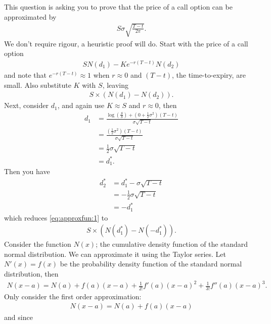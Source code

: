 \documentclass[11pt]{article}
\begin{document}
This question is asking you to prove that the price of a call option can be approximated by
\begin{align*}
  S \sigma \sqrt{\frac{T - t}{2\pi} }
\text{.}
\end{align*}
We don't require rigour, a heuristic proof will do.
Start with the price of a call option
\begin{align}
\label{eq:calloption:price}
S N(d_1)
- K e^{-r(T-t)} N(d_2)
\end{align}
and note that $e^{-r(T-t)} \approx 1$ when $r \approx 0$ and $(T-t)$, the time-to-expiry, are small.
Also substitute $K$ with $S$, leaving
\begin{align} \label{eq:approxfun:1}
S \times ( N(d_1) -  N(d_2) )
\text{.}
\end{align}
Next, consider $d_1$, and again use $K \approx S$ and $r \approx 0$, then
\begin{align*}
 d_1
 &=
 \frac{
      \log\left( \frac{S}{S} \right)
      + \left( 0 + \frac{1}{2}\sigma^2  \right)(T - t)
 }{
 \sigma \sqrt{T - t}
 } \\
 &=
 \frac{
      \left(\frac{1}{2}\sigma^2  \right)(T - t)
 }{
 \sigma \sqrt{T - t}
 } \\
 &=
 \frac{1}{2} \sigma \sqrt{T - t}
\\
 &= d_1^*
\text{.}
\end{align*}
Then you have
\begin{align*}
 d_2^* &= d_1^* - \sigma \sqrt{T - t} \\
       &=  -  \frac{1}{2} \sigma \sqrt{T - t} \\
       &=  - d_1^*
\end{align*}
which reduces
\eqref{eq:approxfun:1} to
\begin{align} \label{eq:approxfun:2}
S \times ( N(d_1^*) -  N(-d_1^*) )
\text{.}
\end{align}
Consider the function $N(x)$; the cumulative density function of the standard normal distribution.
We can approximate it using the Taylor series.
Let $N'(x) = f(x)$ be the probability density function of the standard normal distribution, then
\begin{align*}
N(x - a) = N(a)
          + f(a)(x - a)
          + \frac{1}{2!}f'(a)(x - a)^2
          + \frac{1}{3!}f''(a)(x - a)^3
\text{.}
\end{align*}
Only consider the first order approximation:
\begin{align*}
N(x - a) = N(a)
          + f(a)(x - a)
\end{align*}
and since
\end{document}
